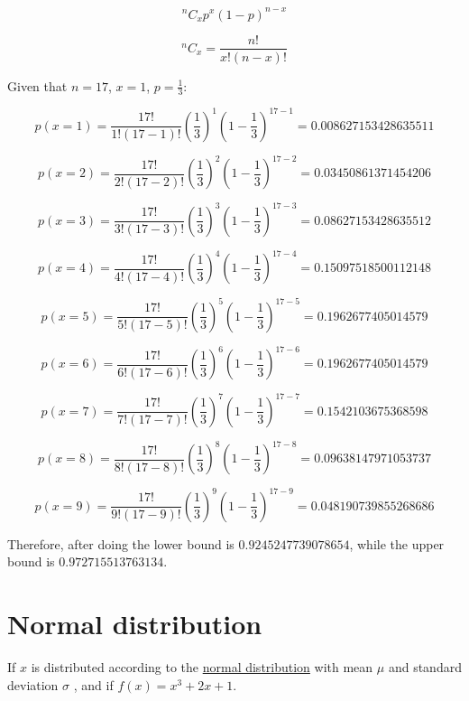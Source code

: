 \documentclass{article}
\begin{document}
\begin{enumerate}
\begin{enumerate}
                $$^{n}C_{x} p^{x} (1 - p)^{n-x}$$

                $$^{n}C_{x} = \frac{n!}{x!(n-x)!}$$

                Given that $n = 17$, $x = 1$, $p = \frac{1}{3}$:

                $$p(x = 1) = \frac{17!}{1!(17-1)!} \left(\frac{1}{3}\right)^{1} \left(1 - \frac{1}{3}\right)^{17-1} = 0.008627153428635511$$

                $$p(x = 2) = \frac{17!}{2!(17-2)!} \left(\frac{1}{3}\right)^{2} \left(1 - \frac{1}{3}\right)^{17-2} = 0.03450861371454206$$

                $$p(x = 3) = \frac{17!}{3!(17-3)!} \left(\frac{1}{3}\right)^{3} \left(1 - \frac{1}{3}\right)^{17-3} = 0.08627153428635512$$

                $$p(x = 4) = \frac{17!}{4!(17-4)!} \left(\frac{1}{3}\right)^{4} \left(1 - \frac{1}{3}\right)^{17-4} = 0.15097518500112148$$

                $$p(x = 5) = \frac{17!}{5!(17-5)!} \left(\frac{1}{3}\right)^{5} \left(1 - \frac{1}{3}\right)^{17-5} = 0.1962677405014579$$

                $$p(x = 6) = \frac{17!}{6!(17-6)!} \left(\frac{1}{3}\right)^{6} \left(1 - \frac{1}{3}\right)^{17-6} = 0.1962677405014579$$

                $$p(x = 7) = \frac{17!}{7!(17-7)!} \left(\frac{1}{3}\right)^{7} \left(1 - \frac{1}{3}\right)^{17-7} = 0.1542103675368598$$

                $$p(x = 8) = \frac{17!}{8!(17-8)!} \left(\frac{1}{3}\right)^{8} \left(1 - \frac{1}{3}\right)^{17-8} = 0.09638147971053737$$

                $$p(x = 9) = \frac{17!}{9!(17-9)!} \left(\frac{1}{3}\right)^{9} \left(1 - \frac{1}{3}\right)^{17-9} = 0.048190739855268686$$

                Therefore, after doing the lower bound is $0.9245247739078654$, while the upper bound is $0.972715513763134$.

            \end{enumerate}
\end{enumerate}

\section{Normal distribution}

If $x$ is distributed according to the \href{https://en.wikipedia.org/wiki/Normal_distribution}{normal distribution} with mean $\mu$ and standard deviation $\sigma$ , and
if $f(x)=x^{3} +2x+1$.
\end{document}
